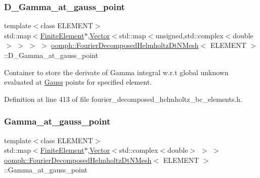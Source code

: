 \subsubsection{\texorpdfstring{D\+\_\+\+Gamma\+\_\+at\+\_\+gauss\+\_\+point}{D\_Gamma\_at\_gauss\_point}}
{\footnotesize\ttfamily template$<$class E\+L\+E\+M\+E\+NT$>$ \\
std\+::map$<$\hyperlink{classoomph_1_1FiniteElement}{Finite\+Element}$\ast$,\hyperlink{classoomph_1_1Vector}{Vector}$<$std\+::map$<$unsigned,std\+::complex$<$double$>$ $>$ $>$ $>$ \hyperlink{classoomph_1_1FourierDecomposedHelmholtzDtNMesh}{oomph\+::\+Fourier\+Decomposed\+Helmholtz\+Dt\+N\+Mesh}$<$ E\+L\+E\+M\+E\+NT $>$\+::D\+\_\+\+Gamma\+\_\+at\+\_\+gauss\+\_\+point\hspace{0.3cm}{\ttfamily [private]}}



Container to store the derivate of Gamma integral w.\+r.\+t global unknown evaluated at \hyperlink{classoomph_1_1Gauss}{Gauss} points for specified element. 



Definition at line 413 of file fourier\+\_\+decomposed\+\_\+helmholtz\+\_\+bc\+\_\+elements.\+h.

\mbox{\label{classoomph_1_1FourierDecomposedHelmholtzDtNMesh_a956867cfdb35fc5a714193bee55a54c4}} 
\subsubsection{\texorpdfstring{Gamma\+\_\+at\+\_\+gauss\+\_\+point}{Gamma\_at\_gauss\_point}}
{\footnotesize\ttfamily template$<$class E\+L\+E\+M\+E\+NT$>$ \\
std\+::map$<$\hyperlink{classoomph_1_1FiniteElement}{Finite\+Element}$\ast$,\hyperlink{classoomph_1_1Vector}{Vector}$<$std\+::complex$<$double$>$ $>$ $>$ \hyperlink{classoomph_1_1FourierDecomposedHelmholtzDtNMesh}{oomph\+::\+Fourier\+Decomposed\+Helmholtz\+Dt\+N\+Mesh}$<$ E\+L\+E\+M\+E\+NT $>$\+::Gamma\+\_\+at\+\_\+gauss\+\_\+point\hspace{0.3cm}{\ttfamily [private]}}



